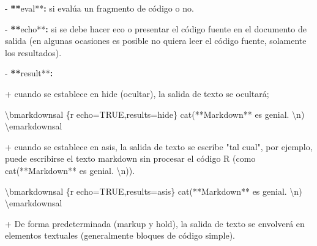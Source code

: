 \documentclass[11pt,a4paper,oneside,]{article}
\newenvironment{Shaded}{\begin{snugshade}}{\end{snugshade}}
\newcommand{\AttributeTok}[1]{\textcolor[rgb]{0.77,0.63,0.00}{#1}}
\newcommand{\ErrorTok}[1]{\textcolor[rgb]{0.64,0.00,0.00}{\textbf{#1}}}
\newcommand{\FunctionTok}[1]{\textcolor[rgb]{0.00,0.00,0.00}{#1}}
\newcommand{\NormalTok}[1]{#1}
\newcommand{\SpecialCharTok}[1]{\textcolor[rgb]{0.00,0.00,0.00}{#1}}
\newcommand{\StringTok}[1]{\textcolor[rgb]{0.31,0.60,0.02}{#1}}
\numberwithin{dummy}{section}
\theoremstyle{ocrenumbox}
\theoremstyle{blacknumex}
\theoremstyle{blacknumbox}
\theoremstyle{ocrenum}
\theoremstyle{ocrenum}
\begin{document}
\begin{Shaded}
\begin{Highlighting}[numbers=left,,]
\SpecialCharTok{{-}} \ErrorTok{**}\NormalTok{eval}\SpecialCharTok{**}\ErrorTok{:}\NormalTok{ si evalúa un fragmento de código o no.}

\SpecialCharTok{{-}} \ErrorTok{**}\NormalTok{echo}\SpecialCharTok{**}\ErrorTok{:}\NormalTok{ si se debe hacer eco o presentar el código fuente en el documento de }\FunctionTok{salida}\NormalTok{ (en algunas ocasiones es posible no quiera leer el código fuente, solamente los resultados).}

\SpecialCharTok{{-}} \ErrorTok{**}\NormalTok{result}\SpecialCharTok{**}\ErrorTok{:} 

    \SpecialCharTok{+}\NormalTok{ cuando se establece en }\StringTok{\textasciigrave{}}\AttributeTok{\textquotesingle{}hide\textquotesingle{}}\StringTok{\textasciigrave{}}\NormalTok{ (ocultar), la salida de texto se ocultará; }
        
\NormalTok{        \textbackslash{}bmarkdownsal}
        \StringTok{\textasciigrave{}\textasciigrave{}\textasciigrave{}}\AttributeTok{\{r echo=TRUE,results=\textquotesingle{}hide\textquotesingle{}\}}
\AttributeTok{        cat(\textquotesingle{}**Markdown** es genial. }\SpecialCharTok{\textbackslash{}n}\AttributeTok{\textquotesingle{})}
\AttributeTok{        }\StringTok{\textasciigrave{}\textasciigrave{}\textasciigrave{}}
\NormalTok{        \textbackslash{}emarkdownsal}
    
    \SpecialCharTok{+}\NormalTok{ cuando se establece en }\StringTok{\textasciigrave{}}\AttributeTok{\textquotesingle{}asis\textquotesingle{}}\StringTok{\textasciigrave{}}\NormalTok{, la salida de texto se escribe }\StringTok{"tal cual"}\NormalTok{, por ejemplo, puede escribirse el texto markdown sin procesar el código }\FunctionTok{R}\NormalTok{ (como }\StringTok{\textasciigrave{}}\AttributeTok{cat(\textquotesingle{}**Markdown** es genial. }\SpecialCharTok{\textbackslash{}n}\AttributeTok{\textquotesingle{})}\StringTok{\textasciigrave{}}\NormalTok{). }

\NormalTok{        \textbackslash{}bmarkdownsal}
        \StringTok{\textasciigrave{}\textasciigrave{}\textasciigrave{}}\AttributeTok{\{r echo=TRUE,results=\textquotesingle{}asis\textquotesingle{}\}}
\AttributeTok{        cat(\textquotesingle{}**Markdown** es genial. }\SpecialCharTok{\textbackslash{}n}\AttributeTok{\textquotesingle{})}
\AttributeTok{        }\StringTok{\textasciigrave{}\textasciigrave{}\textasciigrave{}}
\NormalTok{        \textbackslash{}emarkdownsal}
        
    \SpecialCharTok{+}\NormalTok{ De forma }\FunctionTok{predeterminada}\NormalTok{ (}\StringTok{\textasciigrave{}}\AttributeTok{\textquotesingle{}markup\textquotesingle{}}\StringTok{\textasciigrave{}}\NormalTok{ y }\StringTok{\textasciigrave{}}\AttributeTok{\textquotesingle{}hold\textquotesingle{}}\StringTok{\textasciigrave{}}\NormalTok{), la salida de texto se envolverá en elementos }\FunctionTok{textuales}\NormalTok{ (generalmente bloques de código simple).}


\end{Highlighting}
\end{Shaded}
\end{document}
